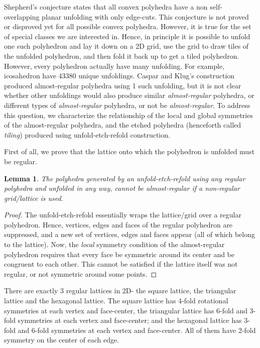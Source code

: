 \documentclass[11pt]{article}
\newtheorem{lemma}[thm]{Lemma}
\newcommand{\1}{\mathds{1}}
\begin{document}
Shepherd's conjecture \cite{Shephard_1975} states that all convex polyhedra have a non self-overlapping planar unfolding with only edge-cuts. This conjecture is not proved or disproved yet for all possible convex polyhedra. However, it is true for the set of special classes we are interested in. Hence, in principle it is possible to unfold one such polyhedron and lay it down on a 2D grid, use the grid to draw tiles of the unfolded polyhedron, and then fold it back up to get a tiled polyhedron. However, every polyhedron actually have many unfolding. For example, icosahedron have 43380 unique unfoldings. Caspar and Klug's construction produced almost-regular polyhedra using 1 such unfolding, but it is not clear whether other unfoldings would also produce similar \emph{almost-regular} polyhedra, or different types of \emph{almost-regular} polyhedra, or not be \emph{almost-regular}. To address this question, we characterize the relationship of the local and global symmetries of the almost-regular polyhedra, and the etched polyhedra (henceforth called \emph{tiling}) produced using unfold-etch-refold construction.

First of all, we prove that the lattice onto which the polyhedron is unfolded must be regular.

\begin{lemma}
\label{lemma:assemblytheory:regulargrid}
 The polyhedra generated by an unfold-etch-refold using any regular polyhedra and unfolded in any way, cannot be \emph{almost-regular} if a non-regular grid/lattice is used.
\end{lemma}

\begin{proof}
 The unfold-etch-refold essentially wraps the lattice/grid over a regular polyhedron. Hence, vertices, edges and faces of the regular polyhedron are suppressed, and a new set of vertices, edges and faces appear (all of which belong to the lattice). Now, the \emph{local} symmetry condition of the almost-regular polyhedron requires that every face be symmetric around its center and be congruent to each other. This cannot be satisfied if the lattice itself was not regular, or not symmetric around some points. 
\end{proof}


There are exactly 3 regular lattices in 2D- the square lattice, the triangular lattice and the hexagonal lattice. The square lattice has 4-fold rotational symmetries at each vertex and face-center, the triangular lattice has 6-fold and 3-fold symmetries at each vertex and face-center; and the hexagonal lattice has 3-fold and 6-fold symmetries at each vertex and face-center. All of them have 2-fold symmetry on the center of each edge.
\end{document}
